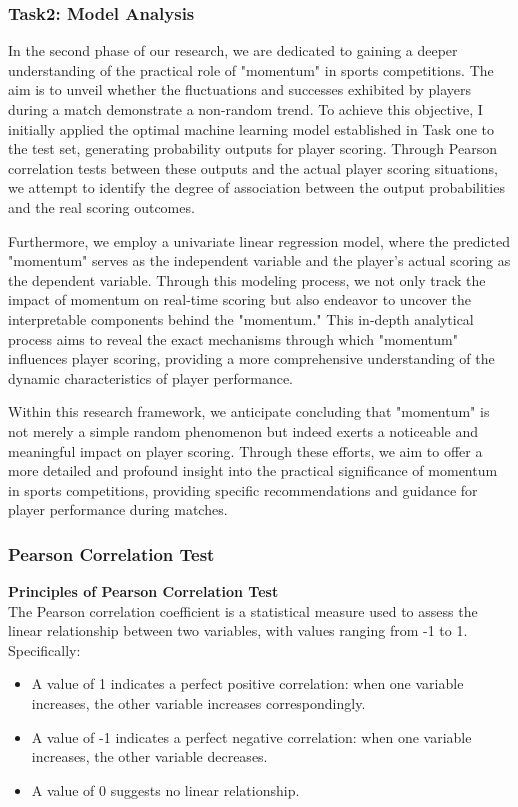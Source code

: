 \documentclass{article}
\begin{document}
\subsubsection{Task2: Model Analysis}
In the second phase of our research, we are dedicated to gaining a deeper understanding of the practical role of "momentum" in sports competitions. The aim is to unveil whether the fluctuations and successes exhibited by players during a match demonstrate a non-random trend.
To achieve this objective, I initially applied the optimal machine learning model established in Task one to the test set, generating probability outputs for player scoring. Through Pearson correlation tests between these outputs and the actual player scoring situations,
we attempt to identify the degree of association between the output probabilities and the real scoring outcomes.

Furthermore, we employ a univariate linear regression model, where the predicted "momentum" serves as the independent variable and the player's actual scoring as the dependent variable. Through this modeling process, we not only track the impact of momentum on real-time scoring
but also endeavor to uncover the interpretable components behind the "momentum." This in-depth analytical process aims to reveal the exact mechanisms through which "momentum" influences player scoring, providing a more comprehensive understanding of the dynamic characteristics of player performance.

Within this research framework, we anticipate concluding that "momentum" is not merely a simple random phenomenon but indeed exerts a noticeable and meaningful impact on player scoring. Through these efforts, we aim to offer a more detailed and profound insight into the practical significance
of momentum in sports competitions, providing specific recommendations and guidance for player performance during matches.
\subsubsection{Pearson Correlation Test}
\textbf{Principles of Pearson Correlation Test}\\

The Pearson correlation coefficient is a statistical measure used to assess the linear relationship between two variables, with values ranging from -1 to 1. Specifically:

\begin{itemize}
  \item A value of 1 indicates a perfect positive correlation: when one variable increases, the other variable increases correspondingly.
  \item A value of -1 indicates a perfect negative correlation: when one variable increases, the other variable decreases.
  \item A value of 0 suggests no linear relationship.
\end{itemize}
\end{document}
